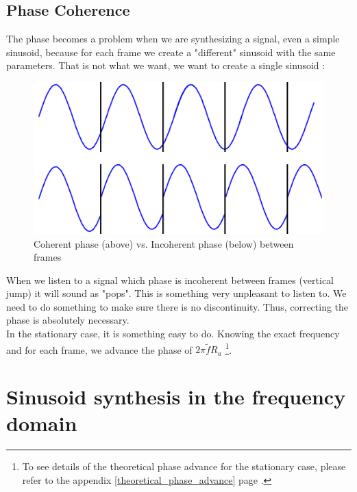 \documentclass[]{article}
\begin{document}
\subsection{Phase Coherence}\label{phase-coherence}
The phase becomes a problem when we are synthesizing a signal, even a simple sinusoid, because for each frame we create a "different" sinusoid with the same parameters. That is not what we want, we want to create a single sinusoid : 
\begin{figure} [H]
	\centering
	\includegraphics[scale = 0.2]{coherentphase.png}
	\caption {Coherent phase (above) vs. Incoherent phase (below) between frames}
\end{figure}
When we listen to a signal which phase is incoherent between frames (vertical jump) it will sound as "pops".  This is something very unpleasant to listen to. We need to do something to make sure there is no discontinuity. Thus, correcting the phase is absolutely necessary. \\
In the stationary case, it is something easy to do. Knowing the exact frequency and for each frame, we advance the phase of $2\pi \tilde{f} R_a$  \footnote{To see details of the theoretical phase advance for the stationary case, please refer to the appendix \ref{theoretical_phase_advance} page \pageref{theoretical_phase_advance}.}.
\section{Sinusoid synthesis in the frequency domain}
\end{document}
